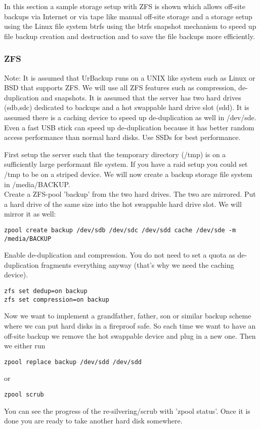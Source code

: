 \documentclass[a4paper,10pt]{article}
\begin{document}
In this section a sample storage setup with ZFS is shown which allows off-site
backups via Internet or via tape like manual off-site storage and a storage setup
using the Linux file system btrfs using the btrfs snapshot mechanism to speed
up file backup creation and destruction and to save the file backups more efficiently.

\subsubsection{ZFS}
\label{subsec_ZFS_setup}

Note: It is assumed that UrBackup runs on a UNIX like system such as Linux or BSD that supports ZFS. We will use all ZFS features such as compression, de-duplication and snapshots. It is assumed that the server has two hard drives (sdb,sdc) dedicated to backups and a hot swappable hard drive slot (sdd). It is assumed there is a caching device to speed up de-duplication as well in /dev/sde. Even a fast USB stick can speed up de-duplication because it has better random access performance than normal hard disks. Use SSDs for best performance. 

First setup the server such that the temporary directory (/tmp) is on a sufficiently large performant file system. If you have a raid setup you could set /tmp to be on a striped device. We will now create a backup storage file system in /media/BACKUP.\\
Create a ZFS-pool 'backup' from the two hard drives. The two are mirrored. Put a hard drive of the same size into the hot swappable hard drive slot. We will mirror it as well:
\begin{verbatim}
zpool create backup /dev/sdb /dev/sdc /dev/sdd cache /dev/sde -m /media/BACKUP
\end{verbatim}
Enable de-duplication and compression. You do not need to set a quota as de-duplication fragments everything anyway (that's why we need the caching device).
\begin{verbatim}
zfs set dedup=on backup
zfs set compression=on backup
\end{verbatim}
Now we want to implement a grandfather, father, son or similar backup scheme where we can put hard disks in a fireproof safe. So each time we want to have an off-site backup we remove the hot swappable device and plug in a new one. Then we either run
\begin{verbatim}
zpool replace backup /dev/sdd /dev/sdd
\end{verbatim}
or
\begin{verbatim}
zpool scrub
\end{verbatim}
You can see the progress of the re-silvering/scrub with 'zpool status'. Once it is done you are ready to take another hard disk somewhere.
\end{document}
